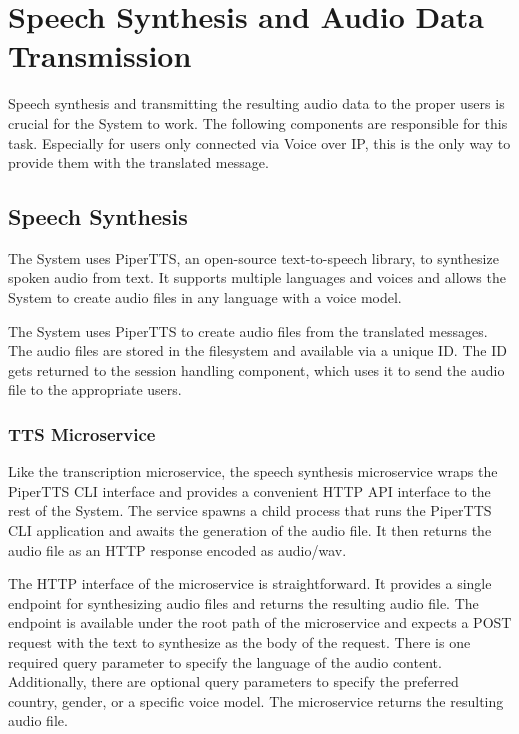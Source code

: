 \chapter{Speech Synthesis and Audio Data Transmission}

\label{SpeechSynthesisAndAudioDataTransmission}

Speech synthesis and transmitting the resulting audio data to the proper users is crucial for the System to work. The 
following components are responsible for this task. Especially for users only connected via Voice over IP, this is the 
only way to provide them with the translated message.


\section{Speech Synthesis}

The System uses PiperTTS, an open-source text-to-speech library, to synthesize spoken audio from text. It supports 
multiple languages and voices and allows the System to create audio files in any language with a voice model.

The System uses PiperTTS to create audio files from the translated messages. The audio files are stored in the 
filesystem and available via a unique ID. The ID gets returned to the session handling component, which uses it to send 
the audio file to the appropriate users.

\subsection{TTS Microservice}

Like the transcription microservice, the speech synthesis microservice wraps the PiperTTS CLI interface and 
provides a convenient HTTP API interface to the rest of the System. The service spawns a child process that runs the 
PiperTTS CLI application and awaits the generation of the audio file. It then returns the audio file as an HTTP response 
encoded as audio/wav.

The HTTP interface of the microservice is straightforward. It provides a single endpoint for synthesizing audio files 
and returns the resulting audio file. The endpoint is available under the root path of the microservice and expects a 
POST request with the text to synthesize as the body of the request. There is one required query parameter to specify 
the language of the audio content. Additionally, there are optional query parameters to specify the preferred country, 
gender, or a specific voice model. The microservice returns the resulting audio file.

